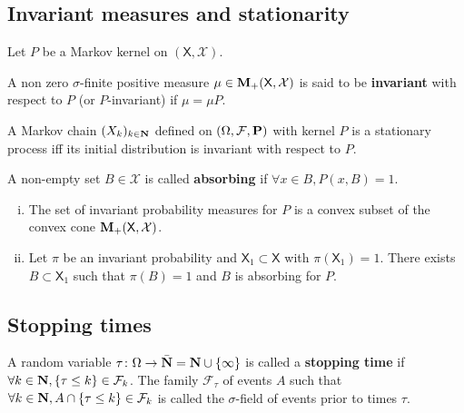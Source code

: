 \subsection{Invariant measures and stationarity}

	Let $P$ be a Markov kernel on $(\mathsf{X},\mathcal{X})$.

	\begin{defn}
		A non zero $\sigma$-finite positive measure $\mu \in \mathbf{M}_+(\mathsf{X},\mathcal{X})$ is said to be \textbf{invariant} with respect to $P$ (or $P$-invariant) if $\mu = \mu P$.
	\end{defn}

	\begin{thm}
		A Markov chain $(X_k)_{k \in \mathbf{N}}$ defined on $(\Omega,\mathcal{F},\mathbf{P})$ with kernel $P$ is a stationary process iff its initial distribution is invariant with respect to $P$.
	\end{thm}

	\begin{defn}
		A non-empty set $B \in \mathcal{X}$ is called \textbf{absorbing} if $\forall x \in B, P(x,B) = 1$.
	\end{defn}

	\begin{thm}
		\begin{enumerate}[(i)]
			\item The set of invariant probability measures for $P$ is a convex subset of the convex cone $\mathbf{M}_+(\mathsf{X},\mathcal{X})$.
			\item Let $\pi$ be an invariant probability and $\mathsf{X}_1 \subset \mathsf{X}$ with $\pi(\mathsf{X}_1) = 1$.
				There exists $B \subset \mathsf{X}_1$ such that $\pi(B) = 1$ and $B$ is absorbing for $P$.
		\end{enumerate}
	\end{thm}


\subsection{Stopping times}

	\begin{defn}
		A random variable $\tau \colon \Omega \to \Bar{\mathbf{N}} = \mathbf{N} \cup \{ \infty \}$ is called a \textbf{stopping time} if $\forall k \in \mathbf{N}, \{ \tau \leq k \} \in \mathcal{F}_k$.
		The family $\mathcal{F}_\tau$ of events $A$ such that $\forall k \in \mathbf{N}, A \cap \{ \tau \leq k \} \in \mathcal{F}_k$ is called the $\sigma$-field of events prior to times $\tau$.
	\end{defn}

